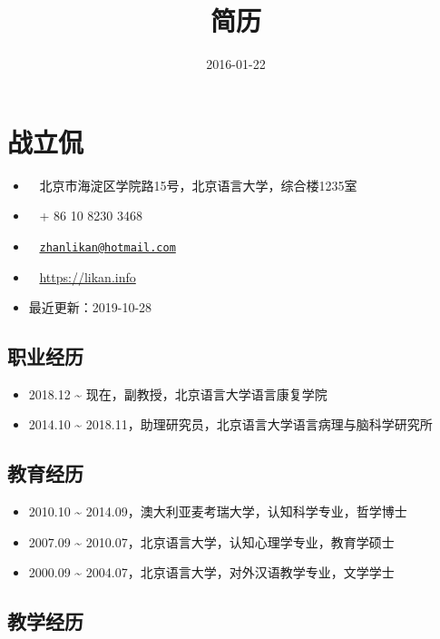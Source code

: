 \documentclass[12pt,]{article}
\title{简历}
\author{}
\date{2016-01-22}
\providecommand{\tightlist}{%
  \setlength{\itemsep}{0pt}\setlength{\parskip}{0pt}}
\begin{document}
\maketitle

\hypertarget{section}{%
\section{战立侃}\label{section}}

\begin{itemize}
\tightlist
\item
  \faUniversity ~ 北京市海淀区学院路15号，北京语言大学，综合楼1235室
\item
  \faPhone* ~ + 86 10 8230 3468
\item
  \faEnvelope[regular] ~
  \href{mailto:zhanlikan@hotmail.com}{\nolinkurl{zhanlikan@hotmail.com}}
\item
  \faGlobe ~ \url{https://likan.info}
\item
  最近更新：2019-10-28
\end{itemize}

\hypertarget{section-1}{%
\subsection{职业经历}\label{section-1}}

\begin{itemize}
\item
  2018.12 \textasciitilde{} 现在，副教授，北京语言大学语言康复学院
\item
  2014.10 \textasciitilde{}
  2018.11，助理研究员，北京语言大学语言病理与脑科学研究所
\end{itemize}

\hypertarget{section-2}{%
\subsection{教育经历}\label{section-2}}

\begin{itemize}
\item
  2010.10 \textasciitilde{}
  2014.09，澳大利亚麦考瑞大学，认知科学专业，哲学博士
\item
  2007.09 \textasciitilde{}
  2010.07，北京语言大学，认知心理学专业，教育学硕士
\item
  2000.09 \textasciitilde{}
  2004.07，北京语言大学，对外汉语教学专业，文学学士
\end{itemize}

\hypertarget{section-3}{%
\subsection{教学经历}\label{section-3}}
\end{document}
